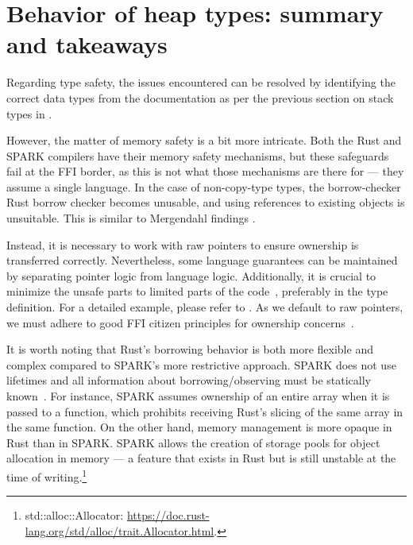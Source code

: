\documentclass[nomenclature, english, bibtex]{kththesis}
\begin{document}
\section{Behavior of heap types: summary and takeaways}
\label{heap-types-behavior}

Regarding type safety, the issues encountered can be resolved by identifying the correct data types from the documentation as per the previous section on stack types in . 

However, the matter of memory safety is a bit more intricate. Both the Rust and SPARK compilers have their memory safety mechanisms, but these safeguards fail at the \gls{FFI} border, as this is not what those mechanisms are there for --- they assume a single language. In the case of non-\gls{copy-type} types, the borrow-checker Rust borrow checker becomes unusable, and using references to existing objects is unsuitable. This is similar to Mergendahl \etal findings \cite{mergendahl_cross-language_2022}.

Instead, it is necessary to work with raw pointers to ensure ownership is transferred correctly. Nevertheless, some language guarantees can be maintained by separating pointer logic from language logic. Additionally, it is crucial to minimize the unsafe parts to limited parts of the code~\cite{miller_step_2018}, preferably in the type definition. For a detailed example, please refer to .
As we default to raw pointers, we must adhere to good FFI citizen principles for ownership concerns~\cite{gjengset_rust_2021, miller_step_2018}. 

It is worth noting that Rust's borrowing behavior is both more flexible and complex compared to SPARK's more restrictive approach. SPARK does not use lifetimes and all information about borrowing/observing must be statically known~\cite{moy_proof_2019}. For instance, SPARK assumes ownership of an entire array when it is passed to a function, which prohibits receiving Rust's slicing of the same array in the same function. 
On the other hand, memory management is more opaque in Rust than in SPARK. SPARK allows the creation of storage pools for object allocation in memory --- a feature that exists in Rust but is still unstable at the time of writing.\footnote{std::alloc::Allocator: \url{https://doc.rust-lang.org/std/alloc/trait.Allocator.html}.} 
\end{document}
